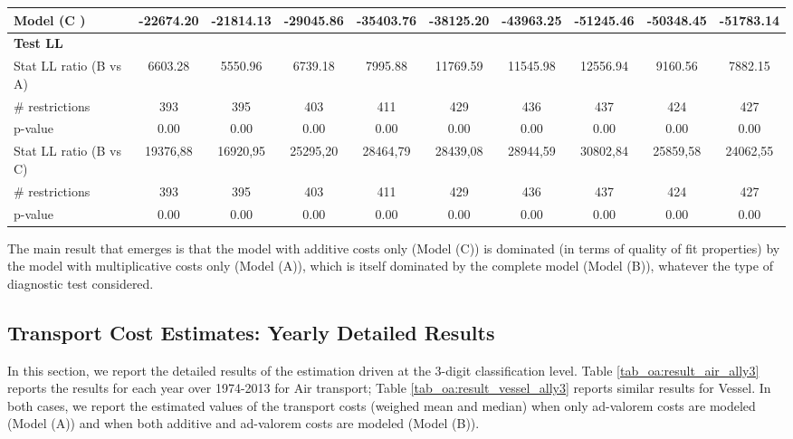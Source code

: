 \documentclass[11pt,twoside, authoryear]{elsarticle}
\begin{document}
\begin{landscape}
\begin{table}[htbp]
{\begin{tabular}{l|c c c c c c c c c}
    Model (C ) & -22674.20 & -21814.13 & -29045.86 & -35403.76 & -38125.20 & -43963.25 & -51245.46 & -50348.45 & -51783.14 \\ \hline
   \multicolumn{10}{l}{ \textbf{Test LL} } \\ \hline
    Stat LL ratio (B vs A) & 6603.28 & 5550.96 & 6739.18 & 7995.88 & 11769.59 & 11545.98 & 12556.94 & 9160.56 & 7882.15 \\
    $\#$ restrictions & 393   & 395   & 403   & 411   & 429   & 436   & 437   & 424   & 427 \\
    p-value & 0.00  & 0.00  & 0.00  & 0.00  & 0.00  & 0.00  & 0.00  & 0.00  & 0.00 \\ \hline
    Stat LL ratio (B vs C) & 19376,88 & 16920,95 & 25295,20 & 28464,79 & 28439,08 & 28944,59 & 30802,84 & 25859,58 & 24062,55 \\
    $\#$ restrictions & 393   & 395   & 403   & 411   & 429   & 436   & 437   & 424   & 427 \\
    p-value & 0.00  & 0.00  & 0.00  & 0.00  & 0.00  & 0.00  & 0.00  & 0.00  & 0.00 \\
\hline \hline
    \end{tabular}%
}
\end{table}%
\end{landscape}

The main result that emerges is that the model with additive costs only (Model (C)) is dominated (in terms of quality of fit properties) by the model with multiplicative costs only (Model (A)), which is itself dominated by the complete model (Model (B)), whatever the type of diagnostic test considered.

\setcounter{table}{0}
\renewcommand{\thetable}{B.\arabic{table}}

\subsection{Transport Cost Estimates: Yearly Detailed Results}
In this section, we report the detailed results of the estimation driven at the 3-digit classification level. Table \ref{tab_oa:result_air_ally3} reports the results for each year over 1974-2013 for Air transport; Table \ref{tab_oa:result_vessel_ally3} reports similar results for Vessel. In both cases, we report the estimated values of the transport costs (weighed mean and median) when only ad-valorem costs are modeled (Model (A)) and when both additive and ad-valorem costs are modeled (Model (B)).
\end{document}
